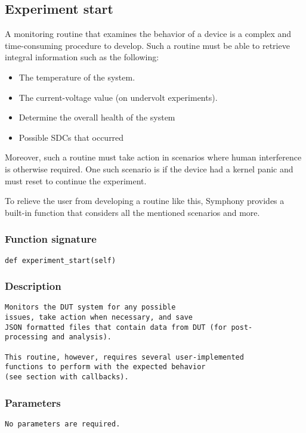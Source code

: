 \subsection{Experiment start}
A monitoring routine that examines the behavior of a device is a complex and time-consuming procedure to develop. Such a routine must be able to retrieve integral information such as the following:
\begin{itemize}
  \item The temperature of the system.
  \item The current-voltage value (on undervolt experiments).
  \item Determine the overall health of the system
  \item Possible SDCs that occurred
\end{itemize}
Moreover, such a routine must take action in scenarios where human interference is otherwise required. One such scenario is if the device had a kernel panic and must reset to continue the experiment. 

To relieve the user from developing a routine like this, Symphony provides a built-in function that considers all the mentioned scenarios and more.

\subsubsection{Function signature}

\begin{lstlisting}
def experiment_start(self)
\end{lstlisting}

\subsubsection{Description}
\begin{lstlisting}[mathescape=true, keywordstyle=\color{black}]
Monitors the DUT system for any possible 
issues, take action when necessary, and save 
JSON formatted files that contain data from DUT (for post-
processing and analysis).

This routine, however, requires several user-implemented 
functions to perform with the expected behavior 
(see section with callbacks). 
\end{lstlisting}

\subsubsection{Parameters}
\begin{lstlisting}[mathescape=true, keywordstyle=\color{black}]
No parameters are required.
\end{lstlisting}

